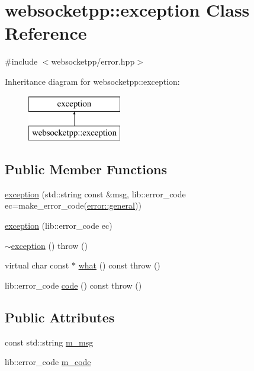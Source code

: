 \hypertarget{classwebsocketpp_1_1exception}{}\section{websocketpp\+:\+:exception Class Reference}
\label{classwebsocketpp_1_1exception}


{\ttfamily \#include $<$websocketpp/error.\+hpp$>$}

Inheritance diagram for websocketpp\+:\+:exception\+:\begin{figure}[H]
\begin{center}
\leavevmode
\includegraphics[height=2.000000cm]{classwebsocketpp_1_1exception}
\end{center}
\end{figure}
\subsection*{Public Member Functions}
\begin{DoxyCompactItemize}
\item 
\hyperlink{classwebsocketpp_1_1exception_af95696b245ec29c38666bf6ac00e95b2}{exception} (std\+::string const \&msg, lib\+::error\+\_\+code ec=make\+\_\+error\+\_\+code(\hyperlink{namespacewebsocketpp_1_1error_a0558d884e44e79146ad4947aea63f68da0cd3808919f43e5fbeee42fbcb808d66}{error\+::general}))
\item 
\hyperlink{classwebsocketpp_1_1exception_aa90a59ff911af87c912fde8ff4d44c92}{exception} (lib\+::error\+\_\+code ec)
\item 
\hyperlink{classwebsocketpp_1_1exception_aa61e782a64249f6518f78de4bb634327}{$\sim$exception} ()  throw ()
\item 
virtual char const $\ast$ \hyperlink{classwebsocketpp_1_1exception_ae453fe481851cbd3e9d0d88c77759d5b}{what} () const   throw ()
\item 
lib\+::error\+\_\+code \hyperlink{classwebsocketpp_1_1exception_a8a578dafec668cff956bc788f022dfc7}{code} () const   throw ()
\end{DoxyCompactItemize}
\subsection*{Public Attributes}
\begin{DoxyCompactItemize}
\item 
const std\+::string \hyperlink{classwebsocketpp_1_1exception_a6a739f94138be314aaac2ef3b5e5b467}{m\+\_\+msg}
\item 
lib\+::error\+\_\+code \hyperlink{classwebsocketpp_1_1exception_ab34949df4a66b0ac7c3f2928364c85c7}{m\+\_\+code}
\end{DoxyCompactItemize}


